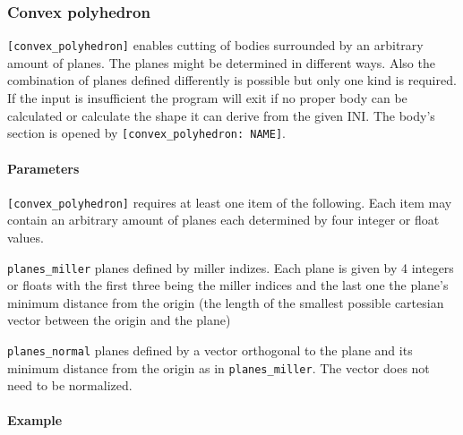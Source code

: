 \subsubsection{Convex polyhedron}

\lstinline{[convex_polyhedron]} enables cutting of bodies surrounded by an arbitrary amount of planes. The planes might be determined in different ways. Also the combination of planes defined differently is possible but only one kind is required. If the input is insufficient the program will exit if no proper body can be calculated or calculate the shape it can derive from the given INI.
The body's section is opened by \lstinline{[convex_polyhedron: NAME]}.

\paragraph{Parameters}
\lstinline{[convex_polyhedron]} requires at least one item of the following. Each item may contain an arbitrary amount of planes each determined by four integer or float values.
\begin{description}
 \item{\lstinline{planes_miller}} planes defined by miller indizes. Each plane is given by 4 integers or floats with the first three being the miller indices and the last one the plane's minimum distance from the origin (the length of the smallest possible cartesian vector between the origin and the plane)
 \item{\lstinline{planes_normal}} planes defined by a vector orthogonal to the plane and its minimum distance from the origin as in \lstinline{planes_miller}. The vector does not need to be normalized.
\end{description} 

\paragraph{Example}\

